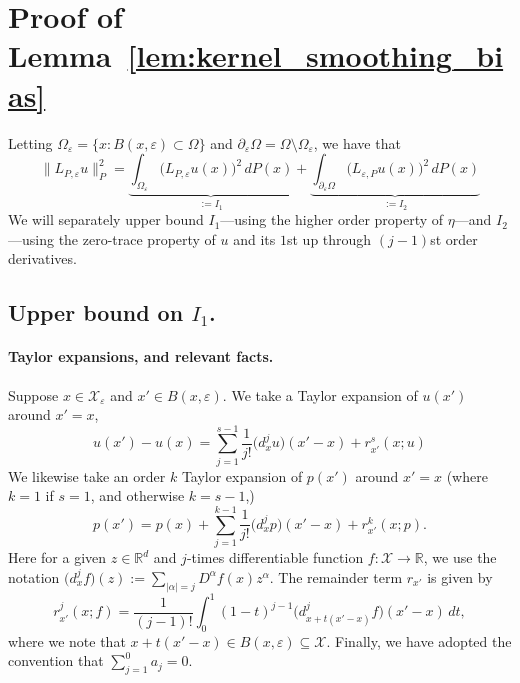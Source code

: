 \documentclass{article}
\newcommand{\Reals}{\mathbb{R}}
\newcommand{\abs}[1]{\left \lvert #1 \right \rvert}
\newcommand{\1}{\mathbf{1}}
\newcommand{\Rd}{\Reals^d}
\newcommand{\mc}[1]{\mathcal{#1}}
\theoremstyle{definition}
\theoremstyle{remark}
\begin{document}
\section{Proof of Lemma~\ref{lem:kernel_smoothing_bias}}
\label{sec:kernel_smoothing_bias_pf}
Letting $\Omega_{\varepsilon} = \{x: B(x,\varepsilon) \subset \Omega\}$ and $\partial_{\varepsilon}\Omega = \Omega \setminus \Omega_{\varepsilon}$, we have that 
\begin{equation*}
\|L_{P,\varepsilon}u\|_P^2 = \underbrace{\int_{\Omega_{\varepsilon}} \bigl(L_{P,\varepsilon}u(x)\bigr)^2 \,dP(x)}_{:=I_1} + \underbrace{\int_{\partial_{\varepsilon}\Omega} \bigl(L_{\varepsilon,P}u(x)\bigr)^2 \,dP(x)}_{:=I_2}
\end{equation*}
We will separately upper bound $I_1$---using the higher order property of $\eta$---and $I_2$---using the zero-trace property of $u$ and its $1$st up through $(j - 1)$st order derivatives. 

\subsection{Upper bound on $I_1$.}
\paragraph{Taylor expansions, and relevant facts.}
Suppose $x \in \mc{X}_{\varepsilon}$ and $x' \in B(x,\varepsilon)$. We take a Taylor expansion of $u(x')$ around $x' = x$,
\begin{equation*}
u(x') - u(x) = \sum_{j = 1}^{s - 1} \frac{1}{j!}\bigl(d_x^{j}u\bigr)(x' - x) + r_{x'}^{s}(x;u)
\end{equation*}
We likewise take an order $k$ Taylor expansion of $p(x')$ around $x'  = x$ (where $k = 1$ if $s = 1$, and otherwise $k = s - 1$,)
\begin{equation*}
p(x') = p(x) + \sum_{j = 1}^{k - 1}\frac{1}{j!}\bigl(d_x^{j}p\bigr)(x' - x) + r_{x'}^{k}(x;p).
\end{equation*}
Here for a given $z \in \Rd$ and $j$-times differentiable function $f: \mc{X} \to \Reals$, we use the notation $\bigl(d_x^jf\bigr)(z) := \sum_{\abs{\alpha} = j} D^{\alpha}f(x) z^{\alpha}$. The remainder term $r_{x'}$ is given by
\begin{equation*}
r_{x'}^j(x;f) = \frac{1}{(j - 1)!} \int_{0}^{1}(1 - t)^{j - 1} \bigl(d_{x + t(x' - x)}^{j}f\bigr)(x' - x) \,dt,
\end{equation*}
where we note that $x + t(x' - x) \in B(x,\varepsilon) \subseteq \mc{X}$. Finally, we have adopted the convention that $\sum_{j = 1}^{0} a_j = 0$.
\end{document}
